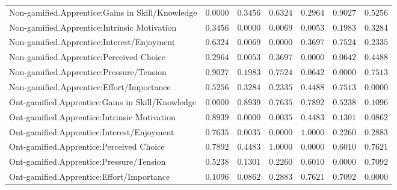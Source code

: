 \begin{landscape}
{\begin{longtable}{lrrrrrr}


Non-gamified.Apprentice:Gains in Skill/Knowledge&$0.0000$&$0.3456$&$0.6324$&$0.2964$&$0.9027$&$0.5256$\tabularnewline
Non-gamified.Apprentice:Intrinsic Motivation&$0.3456$&$0.0000$&$0.0069$&$0.0053$&$0.1983$&$0.3284$\tabularnewline
Non-gamified.Apprentice:Interest/Enjoyment&$0.6324$&$0.0069$&$0.0000$&$0.3697$&$0.7524$&$0.2335$\tabularnewline
Non-gamified.Apprentice:Perceived Choice&$0.2964$&$0.0053$&$0.3697$&$0.0000$&$0.0642$&$0.4488$\tabularnewline
Non-gamified.Apprentice:Pressure/Tension&$0.9027$&$0.1983$&$0.7524$&$0.0642$&$0.0000$&$0.7513$\tabularnewline
Non-gamified.Apprentice:Effort/Importance&$0.5256$&$0.3284$&$0.2335$&$0.4488$&$0.7513$&$0.0000$\tabularnewline
\hline

Ont-gamified.Apprentice:Gains in Skill/Knowledge&$0.0000$&$0.8939$&$0.7635$&$0.7892$&$0.5238$&$0.1096$\tabularnewline
Ont-gamified.Apprentice:Intrinsic Motivation&$0.8939$&$0.0000$&$0.0035$&$0.4483$&$0.1301$&$0.0862$\tabularnewline
Ont-gamified.Apprentice:Interest/Enjoyment&$0.7635$&$0.0035$&$0.0000$&$1.0000$&$0.2260$&$0.2883$\tabularnewline
Ont-gamified.Apprentice:Perceived Choice&$0.7892$&$0.4483$&$1.0000$&$0.0000$&$0.6010$&$0.7621$\tabularnewline
Ont-gamified.Apprentice:Pressure/Tension&$0.5238$&$0.1301$&$0.2260$&$0.6010$&$0.0000$&$0.7092$\tabularnewline
Ont-gamified.Apprentice:Effort/Importance&$0.1096$&$0.0862$&$0.2883$&$0.7621$&$0.7092$&$0.0000$\tabularnewline
\hline

\end{longtable}}\end{landscape}



